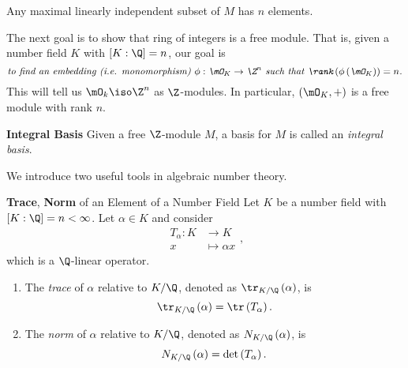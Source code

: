 \documentclass[pmath441]{subfiles}
\begin{document}
    \begin{fact}{}
        Any maximal linearly independent subset of $M$ has $n$ elements.
    \end{fact}

    \np The next goal is to show that ring of integers is a free module. That is, given a number field $K$ with $\left[ K:\Q \right] = n$, our goal is 
    \begin{equation*}
        \text{\textit{to find an embedding (i.e. monomorphism) $\phi:\mO_K\to\Z^n$ such that $\rank\left( \phi\left( \mO_K \right) \right) = n$.}}
    \end{equation*}
    This will tell us $\mO_k\iso\Z^n$ as $\Z$-modules. In particular, $\left( \mO_K,+ \right)$ is a free module with rank $n$.
    
    \begin{definition}{\textbf{Integral Basis}}
        Given a free $\Z$-module $M$, a basis for $M$ is called an \emph{integral basis}.
    \end{definition}

    \np We introduce two useful tools in algebraic number theory.

    \begin{definition}{\textbf{Trace}, \textbf{Norm} of an Element of a Number Field}
        Let $K$ be a number field with $\left[ K:\Q \right]=n<\infty$. Let $\alpha\in K$ and consider
        \begin{equation*}
            \begin{aligned}
                T_{\alpha}:K&\to K \\
                x&\mapsto \alpha x
            \end{aligned} ,
        \end{equation*}
        which is a $\Q$-linear operator.
        \begin{enumerate}
            \item The \emph{trace} of $\alpha$ relative to $K /\Q$, denoted as $\tr_{K /\Q}\left( \alpha \right)$, is
                \begin{equation*}
                    \tr_{K /\Q}\left( \alpha \right) = \tr\left( T_{\alpha} \right).
                \end{equation*}
            \item The \emph{norm} of $\alpha$ relative to $K /\Q$, denoted as $N_{K /\Q}\left( \alpha \right)$, is
                \begin{equation*}
                    N_{K /\Q}\left( \alpha \right) = \det\left( T_{\alpha} \right).
                \end{equation*}
        \end{enumerate}
    \end{definition}
    
\end{document}
